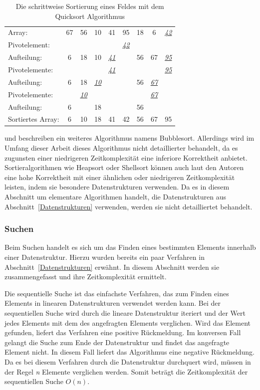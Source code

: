 \begin{table}[b]
	\centering
	\begin{tabular}{l *{8}{c}}
		\hline
		Array: & 67 & 56 & 10 & 41 & 95 & 18 & 6 & \textit{\underline{42}} \\
		Pivotelement: & & & & & \textit{\underline{42}} & & & \\
		Aufteilung: & 6 & 18 & 10 & \textit{\underline{41}} & & 56 & 67 & \textit{\underline{95}} \\
		Pivotelemente: & & & & \textit{\underline{41}} & & & & \textit{\underline{95}} \\
		Aufteilung:  & 6 & 18 & \textit{\underline{10}} & & & 56 & \textit{\underline{67}} & \\
		Pivotelemente: & & \textit{\underline{10}}  & & & & & \textit{\underline{67}} & \\
		Aufteilung: & 6 & & 18 & & & 56 & & \\
		Sortiertes Array: & 6 & 10 & 18 & 41 & 42 & 56 & 67 & 95 \\
		\hline
	\end{tabular}
	\caption{Die schrittweise Sortierung eines Feldes mit dem Quicksort Algorithmus}
	\label{table: quick_sort}
\end{table} 

\Textcite[213-214]{hubwieser_fundamente_2015} und \textcite[582-585]{ernst_grundkurs_2020} beschreiben ein weiteres Algorithmus namens Bubblesort. Allerdings wird im Umfang dieser Arbeit dieses Algorithmus nicht detaillierter behandelt, da es zugunsten einer niedrigeren Zeitkomplexität eine inferiore Korrektheit anbietet. Sortieralgorithmen wie Heapsort oder Shellsort können auch laut den Autoren eine hohe Korrektheit mit einer ähnlichen oder niedrigeren Zeitkomplexität leisten, indem sie besondere Datenstrukturen verwenden. Da es in diesem Abschnitt um elementare Algorithmen handelt, die Datenstrukturen aus Abschnitt~\ref{Datenstrukturen} verwenden, werden sie nicht detailliertet behandelt. 

\subsubsection{Suchen}
Beim Suchen handelt es sich um das Finden eines bestimmten Elements innerhalb einer Datenstruktur. Hierzu wurden bereits ein paar Verfahren in Abschnitt~\ref{Datenstrukturen} erwähnt. In diesem Abschnitt werden sie zusammengefasst und ihre Zeitkomplexität ermittelt. 

Die sequentielle Suche ist das einfachste Verfahren, das zum Finden eines Elements in linearen Datenstrukturen verwendet werden kann. Bei der sequentiellen Suche wird durch die lineare Datenstruktur iteriert und der Wert jedes Elements mit dem des angefragten Elements verglichen. Wird das Element gefunden, liefert das Verfahren eine positive Rückmeldung. Im konversen Fall gelangt die Suche zum Ende der Datenstruktur und findet das angefragte Element nicht. In diesem Fall liefert das Algorithmus eine negative Rückmeldung. Da es bei diesem Verfahren durch die Datenstruktur durchquert wird, müssen in der Regel \textit{n} Elemente verglichen werden. Somit beträgt die Zeitkomplexität der sequentiellen Suche $O(n)$. \autocite[224]{hubwieser_fundamente_2015}

